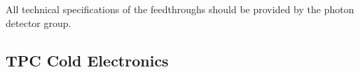 All technical specifications of the feedthroughs should be provided by the photon detector group. 


\subsection{TPC Cold Electronics}
\label{sec:fdsp-pd-intfc-ce}



